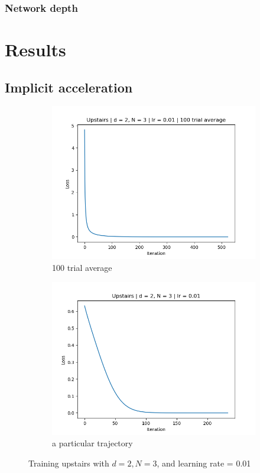 \documentclass[11pt]{article}
\begin{document}
\subsubsection{Network depth}


\pagebreak

\section{Results}
\subsection{Implicit acceleration} \label{sec:results:acceleration}
\begin{figure}[ht]
    \begin{subfigure}{0.5\textwidth}
        \centering
        \includegraphics[width=\textwidth]{images/upstairs_avg_lr1e-2.png}
        \caption{100 trial average}
        \label{fig:upstairs_avg}
    \end{subfigure}
    \begin{subfigure}{0.5\textwidth}
        \centering
        \includegraphics[width=\textwidth]{images/upstairs_1_lr1e-2.png}
        \caption{a particular trajectory}
        \label{fig:upstairs_1}
    \end{subfigure}
    \caption{Training upstairs with $d = 2, N = 3$, and learning rate = 0.01}
    \label{fig:upstairs}
\end{figure}
\end{document}
